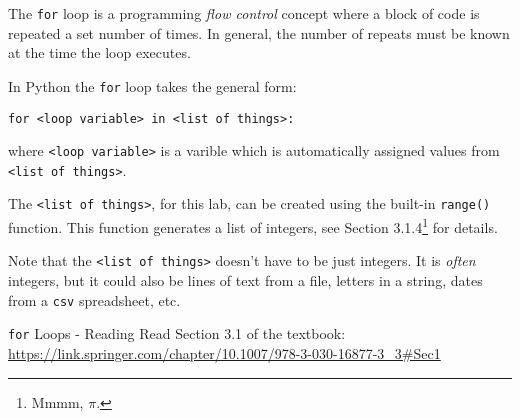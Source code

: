 \documentclass{lab}
\begin{document}
The \texttt{for} loop is a programming \textit{flow control} concept where a block of code is repeated a set number of times. In general, the number of repeats must be known at the time the loop executes.

In Python the \texttt{for} loop takes the general form:

\texttt{for <loop variable> in <list of things>:}

where \texttt{<loop variable>} is a varible which is automatically assigned values from \texttt{<list of things>}.

The \texttt{<list of things>}, for this lab, can be created using the built-in \texttt{range()} function. This function generates a list of integers, see Section 3.1.4\footnote{Mmmm, $\pi$.} for details.

Note that the \texttt{<list of things>} doesn't have to be just integers. It is \textit{often} integers, but it could also be lines of text from a file, letters in a string, dates from a \texttt{csv} spreadsheet, etc.

\begin{task}{\texttt{for} Loops - Reading}{}
Read Section 3.1 of the textbook: \url{https://link.springer.com/chapter/10.1007/978-3-030-16877-3_3#Sec1}
\end{task}
\end{document}
